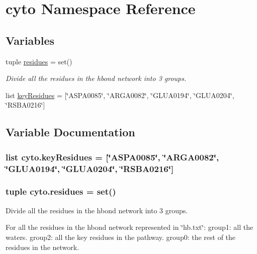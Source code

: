 \hypertarget{namespacecyto}{\section{cyto Namespace Reference}
\label{namespacecyto}
}
\subsection*{Variables}
\begin{DoxyCompactItemize}
\item 
tuple \hyperlink{namespacecyto_a97c3266a3b16c51dcac3bfc04916dc35}{residues} = set()
\begin{DoxyCompactList}\small\item\em Divide all the residues in the hbond network into 3 groups. \end{DoxyCompactList}\item 
list \hyperlink{namespacecyto_ab94d16ced4346a09556ccfaeb34e93ef}{key\-Residues} = \mbox{[}\char`\"{}A\-S\-P\-A0085\char`\"{}, \char`\"{}A\-R\-G\-A0082\char`\"{}, \char`\"{}G\-L\-U\-A0194\char`\"{}, \char`\"{}G\-L\-U\-A0204\char`\"{}, \char`\"{}R\-S\-B\-A0216\char`\"{}\mbox{]}
\end{DoxyCompactItemize}


\subsection{Variable Documentation}
\hypertarget{namespacecyto_ab94d16ced4346a09556ccfaeb34e93ef}{
\subsubsection[{key\-Residues}]{\setlength{\rightskip}{0pt plus 5cm}list cyto.\-key\-Residues = \mbox{[}\char`\"{}A\-S\-P\-A0085\char`\"{}, \char`\"{}A\-R\-G\-A0082\char`\"{}, \char`\"{}G\-L\-U\-A0194\char`\"{}, \char`\"{}G\-L\-U\-A0204\char`\"{}, \char`\"{}R\-S\-B\-A0216\char`\"{}\mbox{]}}}\label{namespacecyto_ab94d16ced4346a09556ccfaeb34e93ef}
\hypertarget{namespacecyto_a97c3266a3b16c51dcac3bfc04916dc35}{
\subsubsection[{residues}]{\setlength{\rightskip}{0pt plus 5cm}tuple cyto.\-residues = set()}}\label{namespacecyto_a97c3266a3b16c51dcac3bfc04916dc35}


Divide all the residues in the hbond network into 3 groups. 

For all the residues in the hbond network represented in \char`\"{}hb.\-txt\char`\"{}\-: group1\-: all the waters. group2\-: all the key residues in the pathway. group0\-: the rest of the residues in the network. 